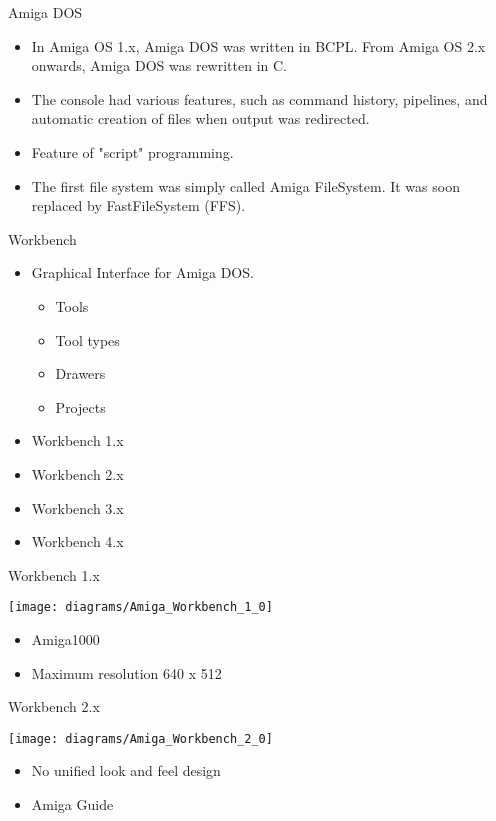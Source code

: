 \documentclass{beamer}
\begin{document}
\begin{frame}{Amiga DOS}
  \begin{itemize}
      	\item In Amiga OS 1.x, Amiga DOS was written in BCPL. From Amiga OS 2.x onwards, Amiga DOS was rewritten in C.

      \item The console had various features,  such as command history, pipelines, and automatic creation of files when output was redirected.
\item Feature of "script" programming.
\item The first file system was simply called Amiga FileSystem. It was soon replaced by FastFileSystem (FFS).
\end{itemize}
\end{frame}



\begin{frame}{Workbench}
  \begin{itemize}
  	\item Graphical Interface for Amiga DOS.
\begin{itemize}
      	\item Tools
	\item Tool types
	\item Drawers
	\item Projects
\end{itemize}
\item Workbench 1.x
\item Workbench 2.x
\item Workbench 3.x
\item Workbench 4.x
\end{itemize}
\end{frame}


\begin{frame}{Workbench 1.x}
 
  \begin{center}
    \texttt{[image: diagrams/Amiga\_Workbench\_1\_0]}
  \end{center}
 
\begin{itemize}
  	\item Amiga1000
	\item Maximum resolution 640 x 512 
	
\end{itemize}
\end{frame}

\begin{frame}{Workbench 2.x}
 
  \begin{center}
    \texttt{[image: diagrams/Amiga\_Workbench\_2\_0]}
  \end{center}
 
\begin{itemize}
  	\item No unified look and feel design 
	\item Amiga Guide
	
\end{itemize}
\end{frame}
\end{document}
